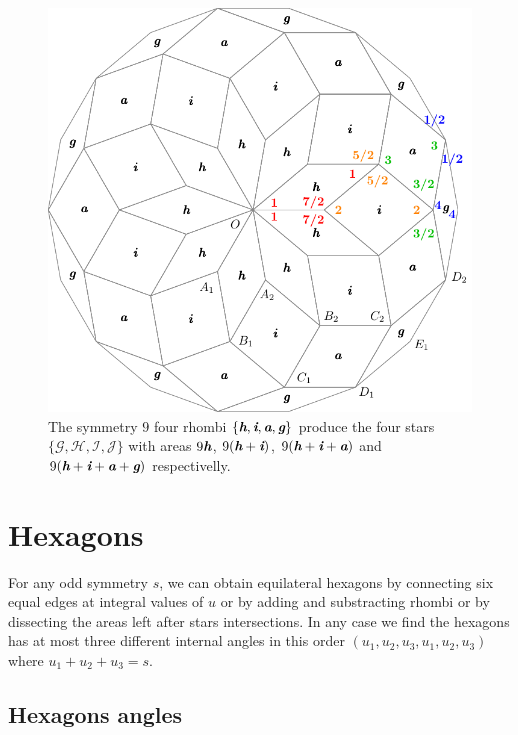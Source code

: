 \documentclass[11pt]{article}
\def\mathbi#1{\textbf{\em #1}}
\begin{document}
\begin{figure}[H]
\centering
\includegraphics[scale=1]{rhombi-9}
\caption{The symmetry $9$ four rhombi $\{\mathbi{h},\mathbi{i},\mathbi{a},\mathbi{g}\}$ produce the four stars $\{\mathcal{G},\mathcal{H},\mathcal{I},\mathcal{J}\}$ with areas
$9\mathbi{h}$,
 $9(\mathbi{h}+\mathbi{i})$,
 $9(\mathbi{h}+\mathbi{i}+\mathbi{a})$ and 
 $9(\mathbi{h}+\mathbi{i}+\mathbi{a}+\mathbi{g})$ respectivelly.}
\label{fig:rhombi-9}
\end{figure}





\section{Hexagons}

For any odd symmetry $s$, we can obtain equilateral hexagons by connecting six equal edges at integral values of $u$ or by adding and substracting rhombi or by dissecting the areas left after stars intersections. In any case we find the hexagons has at most three different internal angles in this order $(u_1, u_2, u_3, u_1, u_2, u_3)$ where $u_1 + u_2 + u_3 = s$.

\subsection{Hexagons angles}
\end{document}
